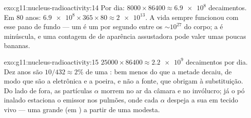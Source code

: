 \begin{solution}{exo:g11:nucleus-radioactivity:14}
Por dia: $8000 \times 86400 \approx \num{6.9e8}$ decaimentos. Em $80$
anos: $\num{6.9e8} \times 365 \times 80 \approx \num{2e13}$. A vida
sempre funcionou com esse pano de fundo --- um  é um  por
segundo entre os $\sim 10^{27}$ do corpo; a  é minúscula, e uma
contagem de  de aparência assustadora pode valer umas poucas
bananas.
\end{solution}

\begin{solution}{exo:g11:nucleus-radioactivity:15}
$\num{25000} \times 86400 \approx \num{2.2e9}$ decaimentos por dia. Dez
anos são $10/432 \approx 2\%$ de uma : bem menos do que a
metade decaiu, de modo que são a eletrônica e a poeira, e não a fonte,
que obrigam à substituição. Do lado de fora, as partículas $\alpha$
morrem no ar da câmara e no invólucro; já o pó inalado estaciona o
emissor nos pulmões, onde cada $\alpha$ despeja a sua  em tecido
vivo --- uma  grande (em ) a partir de uma 
modesta.
\end{solution}

